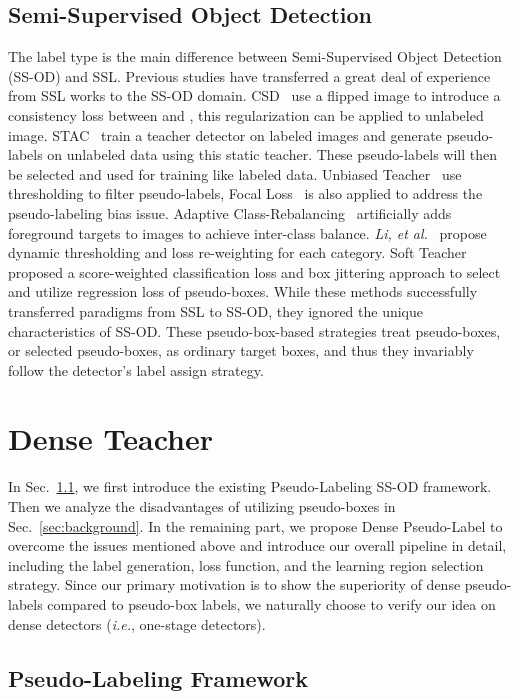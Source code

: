 \documentclass[runningheads]{llncs}
\begin{document}
\subsection{Semi-Supervised Object Detection}
The label type is the main difference between Semi-Supervised Object Detection (SS-OD) and SSL. Previous studies have transferred a great deal of experience from SSL works to the SS-OD domain. 
CSD~\cite{csd} use a flipped image  to introduce a consistency loss between  and , this regularization can be applied to unlabeled image. 
STAC~\cite{stac} train a teacher detector on labeled images and generate pseudo-labels on unlabeled data using this static teacher. These pseudo-labels will then be selected and used for training like labeled data. 
Unbiased Teacher~\cite{ubteacher} use thresholding to filter pseudo-labels, Focal Loss~\cite{focalloss} is also applied to address the pseudo-labeling bias issue. 
Adaptive Class-Rebalancing~\cite{acr} artificially adds foreground targets to images to achieve inter-class balance. \emph{Li, et al.}~\cite{rethinkingp} propose dynamic thresholding and loss re-weighting for each category. 
Soft Teacher~\cite{softteacher} proposed a score-weighted classification loss and box jittering approach to select and utilize regression loss of pseudo-boxes. 
While these methods successfully transferred paradigms from SSL to SS-OD, they ignored the unique characteristics of SS-OD. These pseudo-box-based strategies treat pseudo-boxes, or selected pseudo-boxes, as ordinary target boxes, and thus they invariably follow the detector's label assign strategy.


\section{Dense Teacher}
In Sec.~\ref{sec:plframe}, we first introduce the existing Pseudo-Labeling SS-OD framework. Then we analyze the disadvantages of utilizing pseudo-boxes in Sec.~\ref{sec:background}. In the remaining part, we propose Dense Pseudo-Label to overcome the issues mentioned above and introduce our overall pipeline in detail, including the label generation, loss function, and the learning region selection strategy. Since our primary motivation is to show the superiority of dense pseudo-labels compared to pseudo-box labels, we naturally choose to verify our idea on dense detectors (\emph{i.e.}, one-stage detectors). 



\subsection{Pseudo-Labeling Framework}
\label{sec:plframe}
\end{document}
